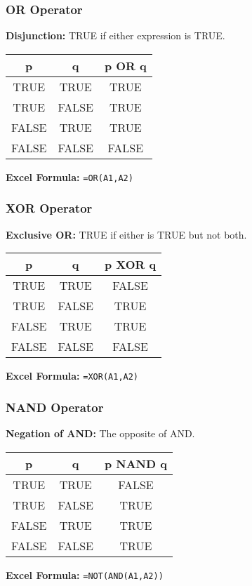 \documentclass{beamer}
\begin{document}
\begin{frame}
\frametitle{OR Operator}
\textbf{Disjunction:} TRUE if \alert{either} expression is TRUE.\pause

\vspace{0.3cm}
\begin{center}
\begin{tabular}{|c|c|c|}
\hline
\textbf{p} & \textbf{q} & \textbf{p OR q} \\
\hline
TRUE & TRUE & TRUE \\
\hline
TRUE & FALSE & TRUE \\
\hline
FALSE & TRUE & TRUE \\
\hline
FALSE & FALSE & FALSE \\
\hline
\end{tabular}
\end{center}\pause

\vspace{0.3cm}
\textbf{Excel Formula:} \texttt{=OR(A1,A2)}
\end{frame}

\begin{frame}
\frametitle{XOR Operator}
\textbf{Exclusive OR:} TRUE if either is TRUE \alert{but not both}.\pause

\vspace{0.3cm}
\begin{center}
\begin{tabular}{|c|c|c|}
\hline
\textbf{p} & \textbf{q} & \textbf{p XOR q} \\
\hline
TRUE & TRUE & FALSE \\
\hline
TRUE & FALSE & TRUE \\
\hline
FALSE & TRUE & TRUE \\
\hline
FALSE & FALSE & FALSE \\
\hline
\end{tabular}
\end{center}\pause

\vspace{0.3cm}
\textbf{Excel Formula:} \texttt{=XOR(A1,A2)}
\end{frame}

\begin{frame}
\frametitle{NAND Operator}
\textbf{Negation of AND:} The opposite of AND.\pause

\vspace{0.3cm}
\begin{center}
\begin{tabular}{|c|c|c|}
\hline
\textbf{p} & \textbf{q} & \textbf{p NAND q} \\
\hline
TRUE & TRUE & FALSE \\
\hline
TRUE & FALSE & TRUE \\
\hline
FALSE & TRUE & TRUE \\
\hline
FALSE & FALSE & TRUE \\
\hline
\end{tabular}
\end{center}\pause

\vspace{0.3cm}
\textbf{Excel Formula:} \texttt{=NOT(AND(A1,A2))}
\end{frame}
\end{document}

